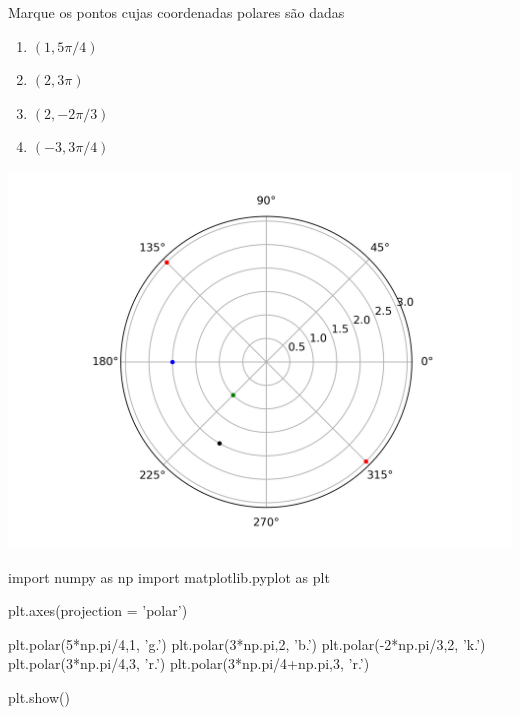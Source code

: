 		\begin{frame}[label=fun-vet]
				\begin{exe}
					Marque os pontos cujas coordenadas polares são dadas
					\begin{multicols}{4}
						\begin{enumerate}[a]
							\item $(1,5\pi/4)$
							
							\item $(2,3\pi)$
							
							\item  $(2,-2\pi/3)$
							
							\item $(-3,3\pi/4)$  \medskip
						\end{enumerate}
					\end{multicols}
				\end{exe}

\begin{center}
\includegraphics[scale=.5]{figuras/polar1.png}
\end{center}

		\end{frame}

\begin{frame}[label=fun-vet,fragile=singleslide]
\begin{block}{ }
\begin{pyverbatim}
import numpy as np
import matplotlib.pyplot as plt
  
plt.axes(projection = 'polar')

plt.polar(5*np.pi/4,1, 'g.')
plt.polar(3*np.pi,2, 'b.')
plt.polar(-2*np.pi/3,2, 'k.')
plt.polar(3*np.pi/4,3, 'r.')
plt.polar(3*np.pi/4+np.pi,3, 'r.')
   
plt.show()
\end{pyverbatim}
\end{block}


\end{frame}



